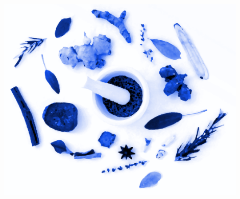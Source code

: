 \vfill
\begin{center}
	\label{img-herbs-title}
	\includegraphics[width=12cm]{res/herbs-906140.png}
\end{center}
\newpage

